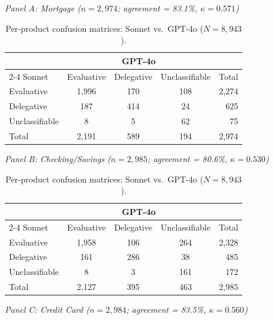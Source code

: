 \begin{table}[H]
\centering
\begin{threeparttable}
\caption{Per-product confusion matrices: Sonnet vs.\ GPT-4o ($N = 8{,}943$).}
\label{tab:product_confusion}
\begin{small}\centering
\textit{Panel A: Mortgage ($n = 2{,}974$; agreement = 83.1\%, $\kappa = 0.571$)}

\medskip
\begin{tabular}{lcccr}
\toprule
 & \multicolumn{3}{c}{GPT-4o} & \\
\cmidrule(lr){2-4}
Sonnet & Evaluative & Delegative & Unclassifiable & Total \\
\midrule
Evaluative      & 1{,}996 & 170 & 108 & 2{,}274 \\
Delegative      &     187 & 414 &  24 &    625 \\
Unclassifiable  &       8 &   5 &  62 &     75 \\
\midrule
Total           & 2{,}191 & 589 & 194 & 2{,}974 \\
\bottomrule
\end{tabular}

\bigskip
\textit{Panel B: Checking/Savings ($n = 2{,}985$; agreement = 80.6\%, $\kappa = 0.530$)}

\medskip
\begin{tabular}{lcccr}
\toprule
 & \multicolumn{3}{c}{GPT-4o} & \\
\cmidrule(lr){2-4}
Sonnet & Evaluative & Delegative & Unclassifiable & Total \\
\midrule
Evaluative      & 1{,}958 & 106 & 264 & 2{,}328 \\
Delegative      &     161 & 286 &  38 &    485 \\
Unclassifiable  &       8 &   3 & 161 &    172 \\
\midrule
Total           & 2{,}127 & 395 & 463 & 2{,}985 \\
\bottomrule
\end{tabular}

\bigskip
\textit{Panel C: Credit Card ($n = 2{,}984$; agreement = 83.5\%, $\kappa = 0.560$)}


\end{small}
\end{threeparttable}
\end{table}

